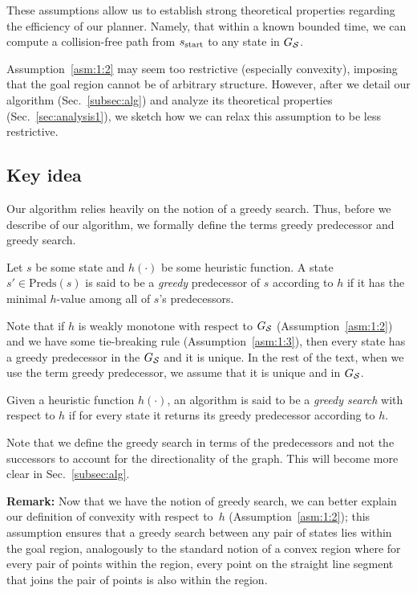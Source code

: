 \documentclass[a4paper]{report}
\begin{document}
These assumptions allow us to establish strong theoretical properties regarding the efficiency of our planner. Namely, that
within a known bounded time, we can compute a collision-free path from $s_{\textrm{start}}$ to any state in $G_\mathcal{S}$. 


Assumption~\ref{asm:1:2} may seem too restrictive (especially convexity), imposing that the goal region cannot be of arbitrary structure. However, after we detail our algorithm (Sec.~\ref{subsec:alg}) and analyze its theoretical properties (Sec.~\ref{sec:analysis1}), we sketch how we can relax this assumption to be less restrictive.


 
\subsection{Key idea}
\label{sec:key}
Our algorithm relies heavily on the notion of a greedy search.  Thus, before we describe of our algorithm, we formally define the terms greedy predecessor and greedy search.

\vspace{2mm}
\begin{definition}
\label{def:greedy-suc}
  Let $s$ be some state and $h(\cdot)$ be some heuristic function.
  A state $s' \in \text{Preds}(s)$ is said to be a \emph{greedy} predecessor of $s$ according to $h$ if it has the minimal $h$-value among all of $s$'s predecessors.
\end{definition}
Note that 
if $h$ is weakly monotone with respect to $G_\mathcal{S}$
(Assumption~\ref{asm:1:2}) 
and we have some tie-breaking rule
(Assumption~\ref{asm:1:3}), then every state has a greedy predecessor in the $G_\mathcal{S}$ and it is unique.
In the rest of the text, when we use the term greedy predecessor, we assume that it is unique and in $G_\mathcal{S}$.

\vspace{2mm}
\begin{definition}
  Given a heuristic function $h(\cdot)$,
  an algorithm is said to be a \emph{greedy search}  with respect to $h$ if for every state it returns its greedy predecessor according to $h$.
\end{definition}
Note that we define the greedy search in terms of the predecessors and not the successors to account for the directionality of the graph. This will become more clear in Sec.~\ref{subsec:alg}.

\textbf{Remark:} Now that we have the notion of greedy search, we can better explain our definition of convexity with respect to~$h$ (Assumption~\ref{asm:1:2});
this assumption ensures that a greedy search between any pair of states lies within the goal region, analogously to the standard notion of a convex region where for every pair of points within the region, every point on the straight line segment that joins the pair of points is also within the region.
\end{document}
